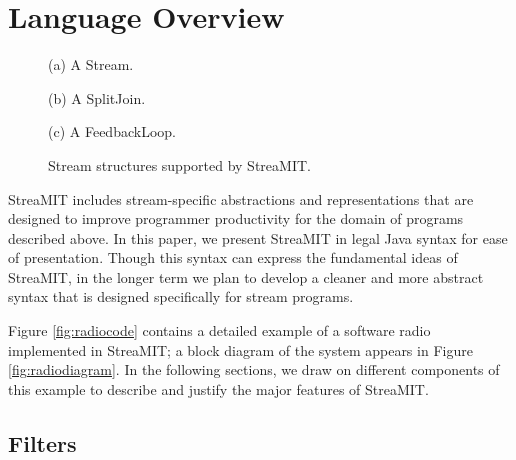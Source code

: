 \section{Language Overview}
\label{sec:overview}

\begin{figure}
\centering
{}

(a) A Stream. \\
\vspace{8pt}

(b) A SplitJoin. \\
\vspace{8pt}

(c) A FeedbackLoop. \\
\vspace{8pt}
\caption{Stream structures supported by StreaMIT.}
\label{fig:structuresp}
\end{figure}

StreaMIT includes stream-specific abstractions and representations
that are designed to improve programmer productivity for the domain of
programs described above.  In this paper, we present StreaMIT in legal
Java syntax for ease of presentation.  Though this syntax can express
the fundamental ideas of StreaMIT, in the longer term we plan to
develop a cleaner and more abstract syntax that is designed
specifically for stream programs.

\begin{figure*}
\centering
{}
\caption{A block diagram of a software radio.  A detailed StreaMIT
implementation appears in Figure \ref{fig:radiocode}.}
\label{fig:radiodiagram}
\end{figure*}

Figure \ref{fig:radiocode} contains a detailed example of a software
radio implemented in StreaMIT; a block diagram of the system appears
in Figure \ref{fig:radiodiagram}.  In the following sections, we draw
on different components of this example to describe and justify the
major features of StreaMIT.

\subsection{Filters}

